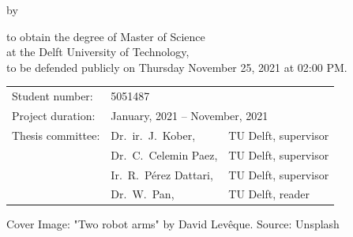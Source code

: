 \begin{titlepage}

\begin{center}

{\makeatletter
\largetitlestyle\fontsize{45}{45}\selectfont\@title
\makeatother}

\bigskip

{\makeatletter
\ifdefvoid{\@subtitle}{}{\subfont\fontsize{20}{20}\selectfont\@subtitle}
\makeatother}

\bigskip
\bigskip

by

\bigskip
\bigskip

{\makeatletter
\largetitlestyle\fontsize{25}{25}\selectfont\@author
\makeatother}

\bigskip
\bigskip

to obtain the degree of Master of Science \\
at the Delft University of Technology, \\
to be defended publicly on Thursday November 25, 2021 at 02:00 PM.

\vfill

\begin{tabular}{lll}
    Student number: & 5051487 \\
        Project duration: & \multicolumn{2}{l}{January, 2021 -- November, 2021} \\
    Thesis committee: & Dr.\ ir.\ J.\ Kober, & TU Delft, supervisor \\
        & Dr.\ C.\ Celemin Paez, & TU Delft, supervisor \\
        & Ir.\ R.\ Pérez Dattari, & TU Delft, supervisor \\
        & Dr.\ W.\ Pan, & TU Delft, reader
\end{tabular}

\vspace{1cm}
\small{Cover Image: "Two robot arms" by David Levêque. Source: Unsplash}

\end{center}


\end{titlepage}
